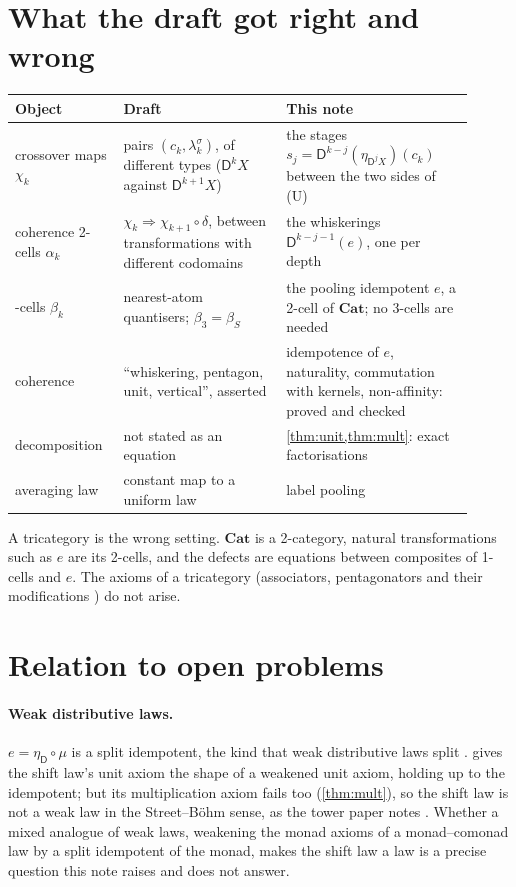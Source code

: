 \documentclass[11pt]{article}
\theoremstyle{definition}
\newcommand{\D}{\mathsf D}
\newcommand{\ls}{\lambda^{\sigma}}
\begin{document}
\section{What the draft got right and wrong}\label{sec:compare}
\begin{center}\small
\begin{tabular}{>{\raggedright\arraybackslash}p{0.2\linewidth}>{\raggedright\arraybackslash}p{0.33\linewidth}>{\raggedright\arraybackslash}p{0.38\linewidth}}
\toprule
Object & Draft & This note\\
\midrule
crossover maps $\chi_k$ & pairs $(c_k,\ls_k)$, of different types ($\D^kX$ against $\D^{k+1}X$) & the stages $s_j=\D^{k-j}(\eta_{\D^jX})(c_k)$ between the two sides of (U)\\
coherence 2-cells $\alpha_k$ & $\chi_k\Rightarrow\chi_{k+1}\circ\delta$, between transformations with different codomains & the whiskerings $\D^{k-j-1}(e)$, one per depth\\
3-cells $\beta_k$ & nearest-atom quantisers; $\beta_3=\beta_S$ & the pooling idempotent $e$, a 2-cell of $\mathbf{Cat}$; no 3-cells are needed\\
coherence & ``whiskering, pentagon, unit, vertical'', asserted & idempotence of $e$, naturality, commutation with kernels, non-affinity: proved and checked\\
decomposition & not stated as an equation & \cref{thm:unit,thm:mult}: exact factorisations\\
averaging law & constant map to a uniform law & label pooling \cite[Thm.~13.16]{Tower}\\
\bottomrule
\end{tabular}
\end{center}
A tricategory is the wrong setting. $\mathbf{Cat}$ is a 2-category, natural transformations such as $e$ are its 2-cells, and the defects are
equations between composites of 1-cells and $e$. The axioms of a tricategory (associators, pentagonators and their modifications
\cite{GordonPowerStreet1995}) do not arise.

\section{Relation to open problems}
\paragraph{Weak distributive laws.} $e=\eta_\D\circ\mu$ is a split idempotent, the kind that weak distributive laws split
\cite{Street2009,Bohm2010}.  gives the shift law's unit axiom the shape of a weakened unit axiom, holding up to the
idempotent; but its multiplication axiom fails too (\cref{thm:mult}), so the shift law is not a weak law in the Street--B\"ohm sense,
as the tower paper notes \cite[Rem.~8.9]{Tower}. Whether a mixed analogue of weak laws, weakening the monad axioms of a monad--comonad
law by a split idempotent of the monad, makes the shift law a law is a precise question this note raises and does not answer.
\end{document}
